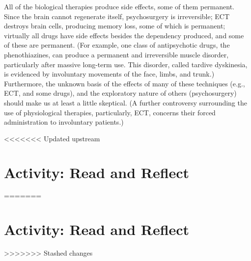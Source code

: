 \documentclass[
]{book}
\begin{document}
All of the biological therapies produce side effects, some of them permanent. Since the brain cannot regenerate itself, psychosurgery is irreversible; ECT destroys brain cells, producing memory loss, some of which is permanent; virtually all drugs have side effects besides the dependency produced, and some of these are permanent. (For example, one class of antipsychotic drugs, the phenothiazines, can produce a permanent and irreversible muscle disorder, particularly after massive long-term use. This disorder, called tardive dyskinesia, is evidenced by involuntary movements of the face, limbs, and trunk.) Furthermore, the unknown basis of the effects of many of these techniques (e.g., ECT, and some drugs), and the exploratory nature of others (psychosurgery) should make us at least a little skeptical. (A further controversy surrounding the use of physiological therapies, particularly, ECT, concerns their forced administration to involuntary patients.)

<<<<<<< Updated upstream
\hypertarget{activity-read-and-reflect-21}{%
\section*{Activity: Read and Reflect}\label{activity-read-and-reflect-21}}
=======
\hypertarget{activity-read-and-reflect-20}{%
\section*{Activity: Read and Reflect}\label{activity-read-and-reflect-20}}
>>>>>>> Stashed changes
\end{document}
